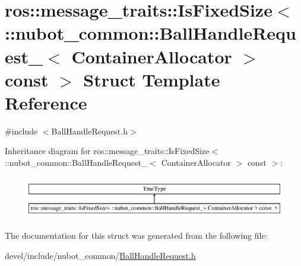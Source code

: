 \hypertarget{structros_1_1message__traits_1_1IsFixedSize_3_01_1_1nubot__common_1_1BallHandleRequest___3_01Coneadde5ba881923a1f46e40ece081a5cf}{\section{ros\-:\-:message\-\_\-traits\-:\-:Is\-Fixed\-Size$<$ \-:\-:nubot\-\_\-common\-:\-:Ball\-Handle\-Request\-\_\-$<$ Container\-Allocator $>$ const $>$ Struct Template Reference}
\label{structros_1_1message__traits_1_1IsFixedSize_3_01_1_1nubot__common_1_1BallHandleRequest___3_01Coneadde5ba881923a1f46e40ece081a5cf}
}


{\ttfamily \#include $<$Ball\-Handle\-Request.\-h$>$}

Inheritance diagram for ros\-:\-:message\-\_\-traits\-:\-:Is\-Fixed\-Size$<$ \-:\-:nubot\-\_\-common\-:\-:Ball\-Handle\-Request\-\_\-$<$ Container\-Allocator $>$ const $>$\-:\begin{figure}[H]
\begin{center}
\leavevmode
\includegraphics[height=1.869783cm]{structros_1_1message__traits_1_1IsFixedSize_3_01_1_1nubot__common_1_1BallHandleRequest___3_01Coneadde5ba881923a1f46e40ece081a5cf}
\end{center}
\end{figure}


The documentation for this struct was generated from the following file\-:\begin{DoxyCompactItemize}
\item 
devel/include/nubot\-\_\-common/\hyperlink{BallHandleRequest_8h}{Ball\-Handle\-Request.\-h}\end{DoxyCompactItemize}
